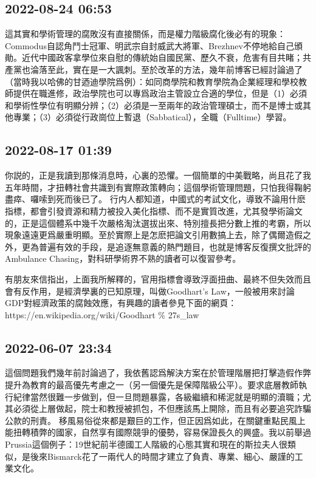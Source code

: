 \documentclass[twocolumn]{ctexart}
\begin{document}
\subsection*{2022-08-24 06:53}

這其實和學術管理的腐敗沒有直接關係，而是權力階級腐化後必有的現象：Commodus自認角鬥士冠軍、明武宗自封威武大將軍、Brezhnev不停地給自己頒勛。近代中國政客拿學位來自慰的傳統始自國民黨、歷久不衰，危害有目共睹；共產黨也淪落至此，實在是一大諷刺。至於改革的方法，幾年前博客已經討論過了（當時我以哈佛的甘迺迪學院爲例）：如同商學院和教育學院為企業經理和學校教師提供在職進修，政治學院也可以專爲政治主管設立合適的學位，但是（1）必須和學術性學位有明顯分辨；（2）必須是一至兩年的政治管理碩士，而不是博士或其他專業；（3）必須從行政崗位上暫退（Sabbatical），全職（Fulltime）學習。
\subsection*{2022-08-17 01:39}

你説的，正是我讀到那條消息時，心裏的恐懼。一個簡單的中美戰略，尚且花了我五年時間，才扭轉社會共識到有實際政策轉向；這個學術管理問題，只怕我得鞠躬盡瘁、囉嗦到死而後已了。
行内人都知道，中國式的考試文化，導致不論用什麽指標，都會引發資源和精力被投入美化指標、而不是實質改進，尤其發學術論文的，正是這個體系中幾千次嚴格淘汰選拔出來、特別擅長把分數上推的考霸，所以現象遠遠更爲嚴重明顯。至於實際上是怎麽把論文引用數搞上去，除了偶爾造假之外，更為普遍有效的手段，是追逐無意義的熱門題目，也就是博客反復撰文批評的Ambulance Chasing，對科研學術界不熟的讀者可以復習參考。

有朋友來信指出，上面我所解釋的，官用指標會導致浮面扭曲、最終不但失效而且會有反作用，是經濟學裏的已知原理，叫做Goodhart's Law，一般被用來討論GDP對經濟政策的腐蝕效應，有興趣的讀者參見下面的網頁：
https://en.wikipedia.org/wiki/Goodhart \% 27s\_law
\subsection*{2022-06-07 23:34}

這個問題我們幾年前討論過了，我依舊認爲解決方案在於管理階層把打擊造假作弊提升為教育的最高優先考慮之一（另一個優先是保障階級公平）。要求底層教師執行紀律當然很難一步做到，但一旦問題暴露，各級繼續和稀泥就是明顯的瀆職；尤其必須從上層做起，院士和教授被抓包，不但應該馬上開除，而且有必要追究詐騙公款的刑責。
移風易俗從來都是艱巨的工作，但正因爲如此，在關鍵重點民風上能扭轉積弊的國家，自然享有國際競爭的優勢，容易保證長久的興盛。我以前舉過Prussia這個例子：19世紀前半德國工人階級的心態其實和現在的斯拉夫人很類似，是後來Bismarck花了一兩代人的時間才建立了負責、專業、細心、嚴謹的工業文化。
\end{document}
